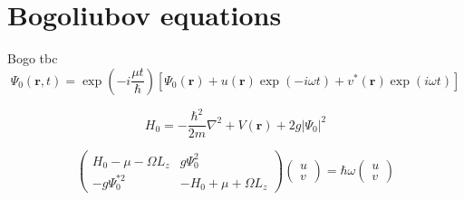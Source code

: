 \section{Bogoliubov equations}
\label{sec:bogo}


Bogo tbc 
\begin{equation}
\Psi_0(\mathbf{r},t) = \exp\left(-i\frac{\mu t}{\hbar}\right)[\Psi_0(\mathbf{r}) + u(\mathbf{r})\exp\left(-i\omega t\right) + v^{*}(\mathbf{r})\exp\left(i\omega t\right) ]
\end{equation}



\begin{equation}
H_0 = -\frac{\hbar^2}{2m}\nabla^2 + V(\mathbf{r}) + 2g\vert \Psi_0 \vert^2
\end{equation}


\begin{equation}
    \begin{pmatrix}
        H_0 - \mu -\Omega L_z & g\Psi_0^2 \\
        -g\Psi_0^{*2} & -H_0 + \mu +\Omega L_z
    \end{pmatrix}
    \begin{pmatrix}
        u \\
        v
    \end{pmatrix}
    = \hbar\omega
    \begin{pmatrix}
        u \\
        v
    \end{pmatrix}
\end{equation}
